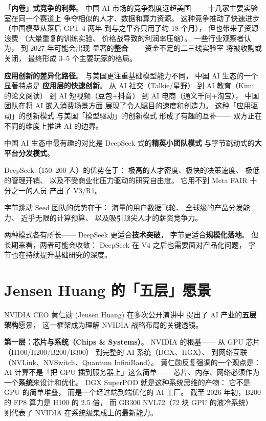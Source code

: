 \textbf{「内卷」式竞争的利弊}。
中国 AI 市场的竞争烈度远超美国——
十几家主要实验室在同一个赛道上
争夺相似的人才、数据和算力资源。
这种竞争推动了快速进步
（中国模型从落后 GPT-4 两年
到与之平齐只用了约 18 个月），
但也带来了资源浪费
（大量重复的训练实验、
价格战导致的利润率压缩）。
一些行业观察者认为，
到 2027 年可能会出现
显著的\textbf{整合}——
资金不足的二三线实验室
将被收购或关闭，
最终形成 3--5 个主要玩家的格局。

\textbf{应用创新的差异化路径}。
与美国更注重基础模型能力不同，
中国 AI 生态的一个显著特点是
\textbf{应用层的快速创新}。
从 AI 社交（Talkie/星野）
到 AI 教育（Kimi 的论文阅读）
到 AI 短视频（豆包+抖音）
到 AI 电商（通义千问+淘宝），
中国团队在将 AI 嵌入消费场景方面
展现了令人瞩目的速度和创造力。
这种「应用驱动」的创新模式
与美国「模型驱动」的创新模式
形成了有趣的互补——
双方正在不同的维度上推进 AI 的边界。

\begin{keybox}
中国 AI 生态中最有趣的对比是
DeepSeek 式的\textbf{精英小团队模式}
与字节跳动式的\textbf{大平台分发模式}。

DeepSeek（150--200 人）的优势在于：
极高的人才密度、极快的决策速度、
极低的管理开销、
以及不受商业化压力驱动的研究自由度。
它用不到 Meta FAIR 十分之一的人员
产出了 V3/R1。

字节跳动 Seed 团队的优势在于：
海量的用户数据飞轮、
全球级的产品分发能力、
近乎无限的计算预算、
以及吸引顶尖人才的薪资竞争力。

两种模式各有所长——
DeepSeek 更适合\textbf{技术突破}，
字节更适合\textbf{规模化落地}。
但长期来看，两者可能会收敛：
DeepSeek 在 V4 之后也需要面对产品化问题，
字节也在持续提升基础研究的深度。
\end{keybox}

\section{Jensen Huang 的「五层」愿景}
\label{sec:jensen-five-layers}

NVIDIA CEO 黄仁勋 (Jensen Huang) 在多次公开演讲中
提出了 AI 产业的\textbf{五层架构}愿景，
这一框架成为理解 NVIDIA 战略布局的关键透镜。

\textbf{第一层：芯片与系统（Chips \& Systems）}。
NVIDIA 的根基——
从 GPU 芯片（H100/H200/B200/B300）
到完整的 AI 系统（DGX、HGX）、
到网络互联（NVLink、NVSwitch、Quantum InfiniBand）。
黄仁勋反复强调的一个观点是：
AI 计算不是「把 GPU 插到服务器上」这么简单——
芯片、内存、网络必须作为一个\textbf{系统}来设计和优化。
DGX SuperPOD 就是这种系统思维的产物：
它不是 GPU 的简单堆叠，
而是一个经过端到端优化的 AI 工厂。
截至 2026 年初，B200 的 FP8 算力是 H100 的 2.5 倍，
而 GB300 NVL72（72 块 GPU 的液冷系统）
则代表了 NVIDIA 在系统级集成上的最新能力。

